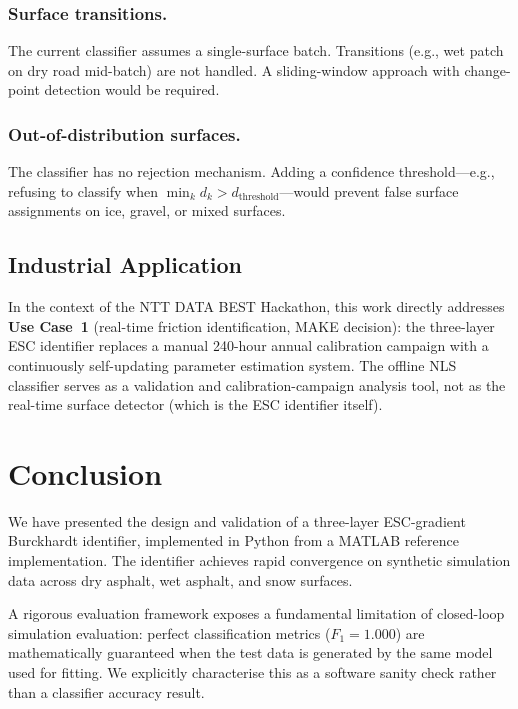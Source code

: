 \documentclass[11pt,a4paper]{article}
\begin{document}
\subsubsection{Surface transitions.}
The current classifier assumes a single-surface batch.
Transitions (e.g., wet patch on dry road mid-batch) are not handled.
A sliding-window approach with change-point detection would be required.

\subsubsection{Out-of-distribution surfaces.}
The classifier has no rejection mechanism.
Adding a confidence threshold---e.g., refusing to classify when
$\min_k d_k > d_\mathrm{threshold}$---would prevent false surface
assignments on ice, gravel, or mixed surfaces.

\subsection{Industrial Application}

In the context of the NTT DATA BEST Hackathon, this work directly addresses
\textbf{Use Case~1} (real-time friction identification, MAKE decision):
the three-layer ESC identifier replaces a manual 240-hour annual calibration
campaign with a continuously self-updating parameter estimation system.
The offline NLS classifier serves as a validation and calibration-campaign
analysis tool, not as the real-time surface detector (which is the ESC identifier
itself).

\section{Conclusion}
\label{sec:conclusion}

We have presented the design and validation of a three-layer ESC-gradient
Burckhardt identifier, implemented in Python from a MATLAB reference implementation.
The identifier achieves rapid convergence on synthetic simulation data across
dry asphalt, wet asphalt, and snow surfaces.

A rigorous evaluation framework exposes a fundamental limitation of
closed-loop simulation evaluation: perfect classification metrics
($F_1 = 1.000$) are mathematically guaranteed when the test data is generated
by the same model used for fitting.
We explicitly characterise this as a software sanity check rather than
a classifier accuracy result.
\end{document}

